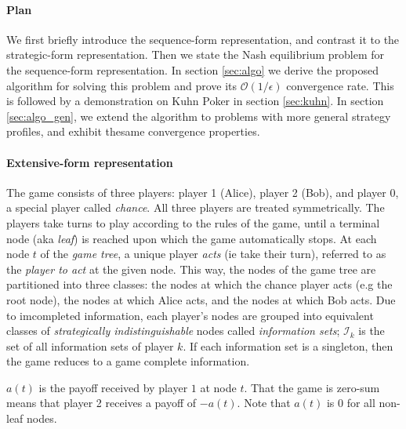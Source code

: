 \documentclass{article} %
\begin{document}
\paragraph{Plan}
We first briefly introduce the sequence-form representation, and contrast it to the strategic-form representation. Then we state the Nash equilibrium problem for the sequence-form representation. In section \ref{sec:algo} we derive the proposed algorithm for solving this problem and prove its $\mathcal{O}(1/\epsilon)$ convergence rate.  This is followed by a demonstration on Kuhn Poker in section \ref{sec:kuhn}. In section \ref{sec:algo_gen}, we extend  the algorithm to problems with more general strategy profiles, and exhibit thesame convergence properties.


\paragraph{Extensive-form representation}
The game consists of three players: player 1 (Alice), player 2 (Bob), and player 0, a special player called \textit{chance}. All three players are treated symmetrically.
The players take turns to play according to the rules of the game, until a terminal node (aka \textit{leaf}) is reached upon which the game automatically stops. %
At each node $t$ of the \textit{game tree}, a unique player \textit{acts} (ie take their turn), referred to as the \textit{player to act} at the given node. This way, the nodes of the game tree are partitioned into three classes: the nodes at which the chance player acts (e.g the root node), the nodes at which Alice acts, and the nodes at which Bob acts. Due to imcompleted information, each player's nodes are grouped into equivalent classes of \textit{strategically indistinguishable} nodes called \textit{information sets}; $\mathcal{I}_k$ is the set of all information sets of player $k$. If each information set is a singleton, then the game reduces to a game complete information.

$a(t)$ is the payoff received by player $1$ at node $t$. That the game is zero-sum means that player 2 receives a payoff of $-a(t)$. Note that $a(t)$ is $0$ for all non-leaf nodes.
\end{document}
